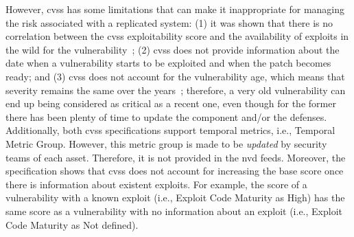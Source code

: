 However, \gls{cvss} has some limitations that can make it inappropriate for managing the risk associated with a replicated system:
(1)  it was shown that there is no correlation between the \gls{cvss} exploitability score and the availability of exploits in the wild for the vulnerability~\cite{Bozorgi:2010}; 
(2) \gls{cvss} does not provide information about the date when a vulnerability starts to be exploited and when the patch becomes ready; 
and (3) \gls{cvss} does not account for the vulnerability age, which means that severity remains the same over the years~\cite{Frei:2006}; therefore, a very old vulnerability can end up being considered as critical as a recent one, even though for the former there has been plenty of time to update the component and/or the defenses.  
Additionally, both \gls{cvss} specifications support temporal metrics, i.e., Temporal Metric Group. 
However, this metric group is made to be \emph{updated} by security teams of each asset. 
Therefore, it is not provided in the \gls{nvd} feeds. 
Moreover, the specification shows that \gls{cvss} does not account for increasing the base score once there is information about existent exploits. 
For example, the score of a vulnerability with a known exploit (i.e., Exploit Code Maturity as High) has the same score as a vulnerability with no information about an exploit (i.e., Exploit Code Maturity as Not defined). 




